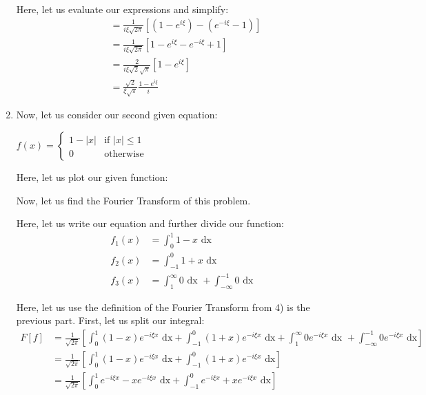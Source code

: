 \begin{enumerate}
Here, let us evaluate our expressions and simplify:
%
\begin{align}
  & =
  \frac{1}{i \xi \sqrt{2 \pi}}
  \left[
  \left(
  1 - e^{i \xi}
  \right)
  -
  \left(
  e^{-i \xi} - 1
  \right)
  \right]\\
  & =
  \frac{1}{i \xi \sqrt{2 \pi}}
  \left[
  1 - e^{i \xi}
  - e^{-i \xi} + 1
  \right]\\
  & =
  \frac{2}{i \xi \sqrt{2} \sqrt{\pi}}
  \left[
  1 - e^{i \xi}
  \right]\\
  & =
  \frac{\sqrt 2}{\xi \sqrt \pi}
  \frac{1 - e^{i \xi}}{i}
\end{align}


\setcounter{equation}{0}
\item Now, let us consider our second given equation:

$\displaystyle
f(x) =
\begin{cases}
  1 - |x| & \text{if } |x| \leq 1\\
  0 & \text{otherwise}
\end{cases}
$

Here, let us plot our given function:

\begin{center}
\end{center}

Now, let us find the Fourier Transform of this problem.

Here, let us write our equation and further divide our function:
%
\begin{align}
  f_1(x) & = \int^1_0 1 - x \text{ dx}\\
  f_2(x) & = \int^0_{-1} 1 + x \text{ dx}\\
  f_3(x) & = \int^\infty_1 0 \text{ dx } + \int^{-1}_{-\infty} 0 \text{ dx}
\end{align}

Here, let us use the definition of the Fourier Transform from 4) is the previous part. First, let us split our integral:
%
\begin{align}
  F[f]
  & = \frac{1}{\sqrt{2 \pi}}
  \left[
    \int^1_0            (1 - x) e^{-i \xi x} \text{ dx}
  + \int^0_{-1}         (1 + x) e^{-i \xi x} \text{ dx}
  + \int^\infty_1       0     e^{-i \xi x} \text{ dx }
  + \int^{-1}_{-\infty} 0     e^{-i \xi x} \text{ dx}
  \right]\\
  & =
  \frac{1}{\sqrt{2 \pi}}
  \left[
    \int^1_0    (1 - x) e^{-i \xi x} \text{ dx}
  + \int^0_{-1} (1 + x) e^{-i \xi x} \text{ dx}
  \right]\\
  & =
  \frac{1}{\sqrt{2 \pi}}
  \left[
    \int^1_0    e^{-i \xi x} - x e^{-i \xi x} \text{ dx}
  + \int^0_{-1} e^{-i \xi x} + x e^{-i \xi x} \text{ dx}
  \right]
\end{align}


\end{enumerate}
